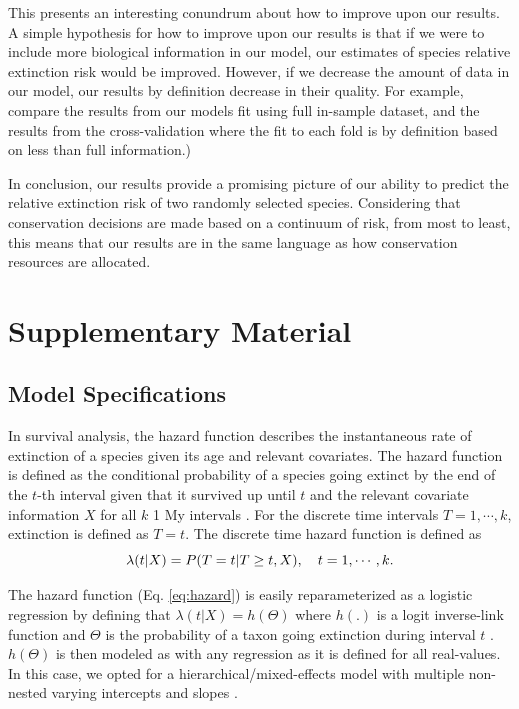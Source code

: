 \documentclass[12pt,letterpaper]{article}
\newcommand{\beginsupplement}{
  \setcounter{table}{0}
  \renewcommand{\thetable}{S\arabic{table}}
  \setcounter{figure}{0}
  \renewcommand{\thefigure}{S\arabic{figure}}
  \setcounter{equation}{0}
  \renewcommand{\theequation}{S\arabic{equation}}
}
\begin{document}
This presents an interesting conundrum about how to improve upon our results. A simple hypothesis for how to improve upon our results is that if we were to include more biological information in our model, our estimates of species relative extinction risk would be improved. However, if we decrease the amount of data in our model, our results by definition decrease in their quality. For example, compare the results from our models fit using full in-sample dataset, and the results from the cross-validation where the fit to each fold is by definition based on less than full information.)



In conclusion, our results provide a promising picture of our ability to predict the relative extinction risk of two randomly selected species. Considering that conservation decisions are made based on a continuum of risk, from most to least, this means that our results are in the same language as how conservation resources are allocated.







\section{Supplementary Material}
\beginsupplement

\subsection{Model Specifications} \label{sec:model_desc}

In survival analysis, the hazard function describes the instantaneous rate of extinction of a species given its age and relevant covariates. The hazard function is defined as the conditional probability of a species going extinct by the end of the \(t\)-th interval given that it survived up until \(t\) and the relevant covariate information \(X\) for all \(k\) 1 My intervals \citep{Tutz2016}. For the discrete time intervals \(T = 1, \cdots, k\), extinction is defined as \(T = t\). The discrete time hazard function is defined as
\begin{equation}
  \lambda(t | X) = P(T = t | T \geq t, X), \quad t = 1, \cdots, k. \\
  \label{eq:hazard}
\end{equation}

The hazard function (Eq. \ref{eq:hazard}) is easily reparameterized as a logistic regression by defining that \(\lambda(t | X) = h(\Theta)\) where \(h(.)\) is a logit inverse-link function and \(\Theta\) is the probability of a taxon going extinction during interval \(t\) \citep{Tutz2016}. \(h(\Theta)\) is then modeled as with any regression as it is defined for all real-values. In this case, we opted for a hierarchical/mixed-effects model with multiple non-nested varying intercepts and slopes \citep{ARM}.
\end{document}
